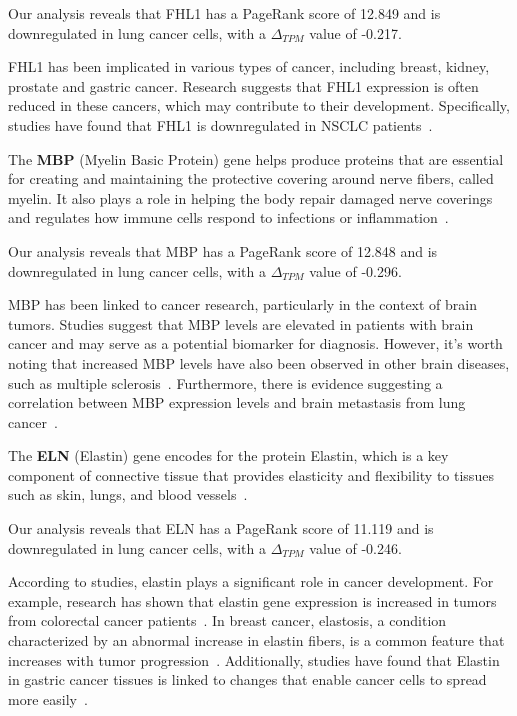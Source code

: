Our analysis reveals that FHL1 has a PageRank score of 12.849 and is downregulated in lung cancer cells,
with a $\Delta_{TPM}$ value of -0.217.

FHL1 has been implicated in various types of cancer, including breast, kidney, prostate and gastric cancer.
Research suggests that FHL1 expression is often reduced in these cancers,
which may contribute to their development\cite{Li2008FHL1, Sakashita2008FHL1}.
Specifically, studies have found that FHL1 is downregulated in NSCLC patients~\cite{Niu2012FHL1}.
\newline

The \textbf{MBP} (Myelin Basic Protein) gene helps produce proteins that are essential for creating and
maintaining the protective covering around nerve fibers, called myelin.
It also plays a role in helping the body repair damaged nerve coverings and
regulates how immune cells respond to infections or inflammation~\cite{Nye1995MBP}.

Our analysis reveals that MBP has a PageRank score of 12.848 and is downregulated in lung cancer cells,
with a $\Delta_{TPM}$ value of -0.296.

MBP has been linked to cancer research, particularly in the context of brain tumors.
Studies suggest that MBP levels are elevated in patients with brain cancer and may serve as a potential biomarker for diagnosis.
However, it's worth noting that increased MBP levels have also been observed in other brain diseases, such as multiple sclerosis~\cite{Zavialova2017MBP}.
Furthermore, there is evidence suggesting a correlation between MBP expression levels and brain metastasis from lung cancer~\cite{Nakagawa1994MBP}.
\newline

The \textbf{ELN} (Elastin) gene encodes for the protein Elastin, which is a key component of connective tissue that provides elasticity and
flexibility to tissues such as skin, lungs, and blood vessels~\cite{Debelle1999ELN}.

Our analysis reveals that ELN has a PageRank score of 11.119 and is downregulated in lung cancer cells,
with a $\Delta_{TPM}$ value of -0.246.

According to studies, elastin plays a significant role in cancer development.
For example, research has shown that elastin gene expression is increased in tumors from colorectal cancer patients~\cite{Li2020ELN}.
In breast cancer, elastosis, a condition characterized by an abnormal increase in elastin fibers,
is a common feature that increases with tumor progression~\cite{Lepucki2022ELN}.
Additionally, studies have found that Elastin in gastric cancer tissues is linked to changes that enable cancer cells
to spread more easily~\cite{Fang2023ELN}.
\newline

